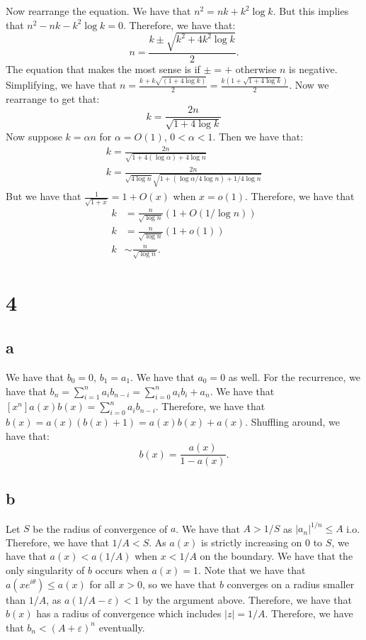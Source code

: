 \documentclass[]{article}
\begin{document}
Now rearrange the equation. We have that $n^2 = nk + k^2 \log k$. But this implies that $n^2 - nk - k^2 \log k = 0$. Therefore, we have that:
\begin{equation}
	n = \frac{k \pm \sqrt{k^2 + 4 k^2 \log k}}{2}.
\end{equation}
The equation that makes the most sense is if $\pm = +$ otherwise $n$ is negative. 
Simplifying, we have that $n = \frac{k + k \sqrt{(1 + 4\log k)}}{2} = \frac{k (1 + \sqrt{1 + 4\log k})}{2}$. Now we rearrange to get that:
\begin{equation}
	k = \frac{2n}{\sqrt{1 + 4\log k}}
\end{equation}
Now suppose $k = \alpha n$ for $\alpha = O(1)$, $0 < \alpha < 1$. 
Then we have that:
\begin{align*}
	k = \frac{2n}{\sqrt{1 + 4(\log \alpha) + 4\log n}}\\
	k = \frac{2n}{\sqrt{4\log n} \sqrt{1 + (\log \alpha/4\log n) + 1/4\log n}}
\end{align*}
But we have that $\frac{1}{\sqrt{1 + x}} = 1 + O(x)$ when $x = o(1)$. Therefore, we have that
\begin{align*}
	k &= \frac{n}{\sqrt{\log n}} \left( 1 + O(1/ \log n) \right)\\
	k &=\frac{n}{\sqrt{\log n}} (1 + o(1))\\
	k &\sim \frac{n}{\sqrt{\log n}}.
\end{align*}

\section{4}
\subsection{a}
We have that $b_0 = 0$, $b_1 = a_1$. We have that $a_0 = 0$ as well. For the recurrence, we have that $b_n = \sum_{i = 1}^{n} a_i b_{n - i} = \sum_{i = 0}^{n} a_i b_i + a_n$. We have that $[x^n]a(x) b(x) = \sum_{i = 0}^{n} a_i b_{n - i}$.  Therefore, we have that $b(x) =  a(x)(b(x) + 1) = a(x) b(x) + a(x)$. Shuffling around, we have that:
\begin{equation}
	b(x) = \frac{a(x)}{1 - a(x)}.
\end{equation}
\subsection{b}
Let $S$ be the radius of convergence of $a$. We have that $A > 1/S$ as $|a_n|^{1/n} \leq A$ i.o. Therefore, we have that $1/A < S$. As $a(x)$ is strictly increasing on $0$ to $S$, we have that $a(x) < a(1/A)$ when $x < 1/A$ on the boundary. We have that the only singularity of $b$ occurs when $a(x) = 1$. Note that we have that $a(x e^{i\theta}) \leq a(x)$ for all $x> 0$, so we have that $b$ converges on a radius smaller than $1/A$, as $a(1/A - \varepsilon) < 1$ by the argument above. Therefore, we have that $b(x)$ has a radius of convergence which includes $|z| = 1/A$. Therefore, we have that $b_n < \left(A + \varepsilon \right)^n$ eventually. 
\end{document}
